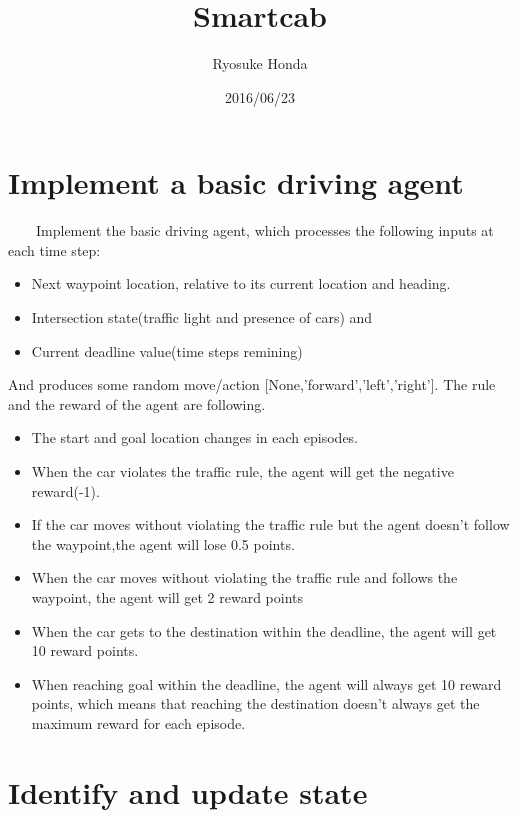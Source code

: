 \documentclass[a4paper,11pt]{article}
\begin{document}
\title{Smartcab}
\author{Ryosuke Honda}
\date{2016/06/23}
\maketitle




\section{Implement a basic driving agent}
\ \ \ \ Implement the basic driving agent, which processes the following inputs at each time step:
\begin{itemize}
\item Next waypoint location, relative to its current location and heading.
\item Intersection state(traffic light and presence of cars) and
\item Current deadline value(time steps remining)
\end{itemize}

And produces some random move/action [None,'forward','left','right'].
The rule and the reward of the agent are following.

\begin{itemize}
\item The start and goal location changes in each episodes.
\item When the car violates the traffic rule, the agent will get the negative reward(-1).
\item If the car moves without violating the traffic rule but the agent doesn't follow the waypoint,the agent will lose 0.5 points.
\item When the car moves without violating the traffic rule and follows the waypoint, the agent will get 2 reward points
\item When the car gets to the destination within the deadline, the agent will get 10 reward points.
\item When reaching goal within the deadline, the agent will always get 10 reward points, which means that reaching the destination doesn't always get the maximum reward for each episode.
 
\end{itemize}






\section{Identify and update state}
\end{document}
